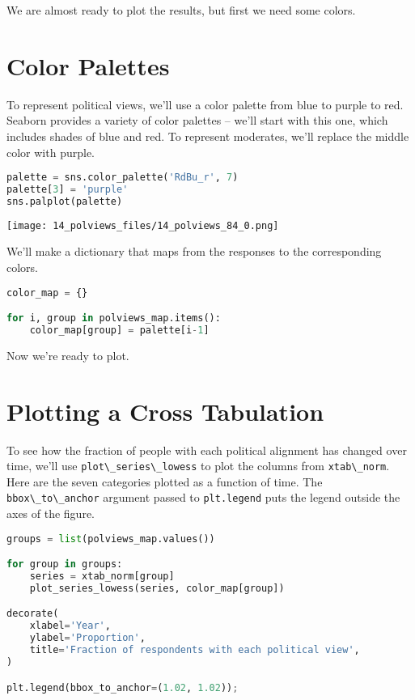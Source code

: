 We are almost ready to plot the results, but first we need some colors.

\section{Color Palettes}\label{color-palettes}

To represent political views, we'll use a color palette from blue to
purple to red. Seaborn provides a variety of color palettes -- we'll
start with this one, which includes shades of blue and red. To represent
moderates, we'll replace the middle color with purple.

\begin{lstlisting}[language=Python,style=source]
palette = sns.color_palette('RdBu_r', 7)
palette[3] = 'purple'
sns.palplot(palette)
\end{lstlisting}

\begin{center}
\texttt{[image: 14\_polviews\_files/14\_polviews\_84\_0.png]}
\end{center}

We'll make a dictionary that maps from the responses to the
corresponding colors.

\begin{lstlisting}[language=Python,style=source]
color_map = {}

for i, group in polviews_map.items():
    color_map[group] = palette[i-1]
\end{lstlisting}

Now we're ready to plot.

\section{Plotting a Cross Tabulation}\label{plotting-a-cross-tabulation}

To see how the fraction of people with each political alignment has
changed over time, we'll use
\passthrough{\lstinline!plot\_series\_lowess!} to plot the columns from
\passthrough{\lstinline!xtab\_norm!}. Here are the seven categories
plotted as a function of time. The
\passthrough{\lstinline!bbox\_to\_anchor!} argument passed to
\passthrough{\lstinline!plt.legend!} puts the legend outside the axes of
the figure.

\begin{lstlisting}[language=Python,style=source]
groups = list(polviews_map.values())

for group in groups:
    series = xtab_norm[group]
    plot_series_lowess(series, color_map[group])

decorate(
    xlabel='Year',
    ylabel='Proportion',
    title='Fraction of respondents with each political view',
)

plt.legend(bbox_to_anchor=(1.02, 1.02));
\end{lstlisting}

